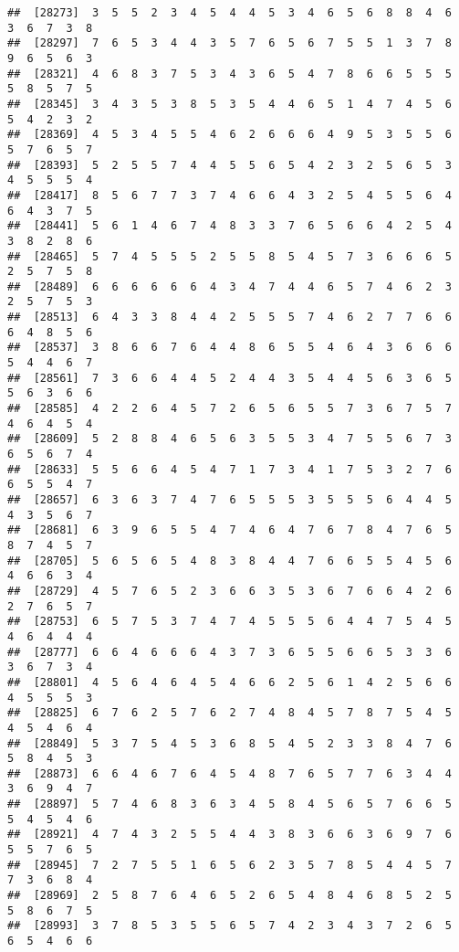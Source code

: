 \documentclass[
]{book}
\begin{document}
\begin{verbatim}
##  [28273]  3  5  5  2  3  4  5  4  4  5  3  4  6  5  6  8  8  4  6  3  6  7  3  8
##  [28297]  7  6  5  3  4  4  3  5  7  6  5  6  7  5  5  1  3  7  8  9  6  5  6  3
##  [28321]  4  6  8  3  7  5  3  4  3  6  5  4  7  8  6  6  5  5  5  5  8  5  7  5
##  [28345]  3  4  3  5  3  8  5  3  5  4  4  6  5  1  4  7  4  5  6  5  4  2  3  2
##  [28369]  4  5  3  4  5  5  4  6  2  6  6  6  4  9  5  3  5  5  6  5  7  6  5  7
##  [28393]  5  2  5  5  7  4  4  5  5  6  5  4  2  3  2  5  6  5  3  4  5  5  5  4
##  [28417]  8  5  6  7  7  3  7  4  6  6  4  3  2  5  4  5  5  6  4  6  4  3  7  5
##  [28441]  5  6  1  4  6  7  4  8  3  3  7  6  5  6  6  4  2  5  4  3  8  2  8  6
##  [28465]  5  7  4  5  5  5  2  5  5  8  5  4  5  7  3  6  6  6  5  2  5  7  5  8
##  [28489]  6  6  6  6  6  6  4  3  4  7  4  4  6  5  7  4  6  2  3  2  5  7  5  3
##  [28513]  6  4  3  3  8  4  4  2  5  5  5  7  4  6  2  7  7  6  6  6  4  8  5  6
##  [28537]  3  8  6  6  7  6  4  4  8  6  5  5  4  6  4  3  6  6  6  5  4  4  6  7
##  [28561]  7  3  6  6  4  4  5  2  4  4  3  5  4  4  5  6  3  6  5  5  6  3  6  6
##  [28585]  4  2  2  6  4  5  7  2  6  5  6  5  5  7  3  6  7  5  7  4  6  4  5  4
##  [28609]  5  2  8  8  4  6  5  6  3  5  5  3  4  7  5  5  6  7  3  6  5  6  7  4
##  [28633]  5  5  6  6  4  5  4  7  1  7  3  4  1  7  5  3  2  7  6  6  5  5  4  7
##  [28657]  6  3  6  3  7  4  7  6  5  5  5  3  5  5  5  6  4  4  5  4  3  5  6  7
##  [28681]  6  3  9  6  5  5  4  7  4  6  4  7  6  7  8  4  7  6  5  8  7  4  5  7
##  [28705]  5  6  5  6  5  4  8  3  8  4  4  7  6  6  5  5  4  5  6  4  6  6  3  4
##  [28729]  4  5  7  6  5  2  3  6  6  3  5  3  6  7  6  6  4  2  6  2  7  6  5  7
##  [28753]  6  5  7  5  3  7  4  7  4  5  5  5  6  4  4  7  5  4  5  4  6  4  4  4
##  [28777]  6  6  4  6  6  6  4  3  7  3  6  5  5  6  6  5  3  3  6  3  6  7  3  4
##  [28801]  4  5  6  4  6  4  5  4  6  6  2  5  6  1  4  2  5  6  6  4  5  5  5  3
##  [28825]  6  7  6  2  5  7  6  2  7  4  8  4  5  7  8  7  5  4  5  4  5  4  6  4
##  [28849]  5  3  7  5  4  5  3  6  8  5  4  5  2  3  3  8  4  7  6  5  8  4  5  3
##  [28873]  6  6  4  6  7  6  4  5  4  8  7  6  5  7  7  6  3  4  4  3  6  9  4  7
##  [28897]  5  7  4  6  8  3  6  3  4  5  8  4  5  6  5  7  6  6  5  5  4  5  4  6
##  [28921]  4  7  4  3  2  5  5  4  4  3  8  3  6  6  3  6  9  7  6  5  5  7  6  5
##  [28945]  7  2  7  5  5  1  6  5  6  2  3  5  7  8  5  4  4  5  7  7  3  6  8  4
##  [28969]  2  5  8  7  6  4  6  5  2  6  5  4  8  4  6  8  5  2  5  5  8  6  7  5
##  [28993]  3  7  8  5  3  5  5  6  5  7  4  2  3  4  3  7  2  6  5  6  5  4  6  6

\end{verbatim}
\end{document}
